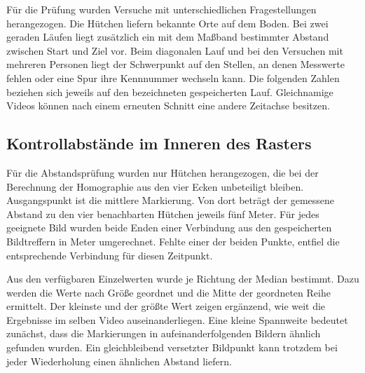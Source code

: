Für die Prüfung wurden Versuche mit unterschiedlichen Fragestellungen herangezogen. Die Hütchen liefern bekannte Orte auf dem Boden. Bei zwei geraden Läufen liegt zusätzlich ein mit dem Maßband bestimmter Abstand zwischen Start und Ziel vor. Beim diagonalen Lauf und bei den Versuchen mit mehreren Personen liegt der Schwerpunkt auf den Stellen, an denen Messwerte fehlen oder eine Spur ihre Kennnummer wechseln kann. Die folgenden Zahlen beziehen sich jeweils auf den bezeichneten gespeicherten Lauf. Gleichnamige Videos können nach einem erneuten Schnitt eine andere Zeitachse besitzen.

\subsection{Kontrollabstände im Inneren des Rasters}
Für die Abstandsprüfung wurden nur Hütchen herangezogen, die bei der Berechnung der Homographie aus den vier Ecken unbeteiligt bleiben. Ausgangspunkt ist die mittlere Markierung. Von dort beträgt der gemessene Abstand zu den vier benachbarten Hütchen jeweils fünf Meter. Für jedes geeignete Bild wurden beide Enden einer Verbindung aus den gespeicherten Bildtreffern in Meter umgerechnet. Fehlte einer der beiden Punkte, entfiel die entsprechende Verbindung für diesen Zeitpunkt.

Aus den verfügbaren Einzelwerten wurde je Richtung der Median bestimmt. Dazu werden die Werte nach Größe geordnet und die Mitte der geordneten Reihe ermittelt. Der kleinste und der größte Wert zeigen ergänzend, wie weit die Ergebnisse im selben Video auseinanderliegen. Eine kleine Spannweite bedeutet zunächst, dass die Markierungen in aufeinanderfolgenden Bildern ähnlich gefunden wurden. Ein gleichbleibend versetzter Bildpunkt kann trotzdem bei jeder Wiederholung einen ähnlichen Abstand liefern.

